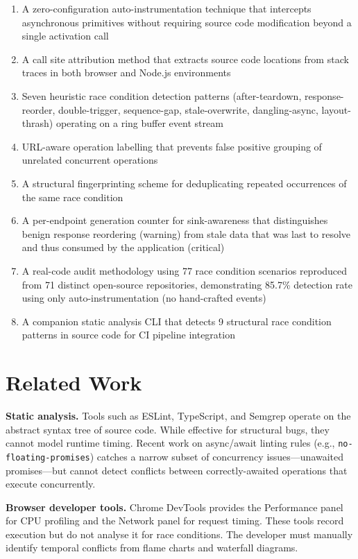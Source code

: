 \documentclass[11pt,a4paper]{article}
\begin{document}
\begin{enumerate}
  \item A zero-configuration auto-instrumentation technique that intercepts asynchronous primitives without requiring source code modification beyond a single activation call
  \item A call site attribution method that extracts source code locations from stack traces in both browser and Node.js environments
  \item Seven heuristic race condition detection patterns (after-teardown, response-reorder, double-trigger, sequence-gap, stale-overwrite, dangling-async, layout-thrash) operating on a ring buffer event stream
  \item URL-aware operation labelling that prevents false positive grouping of unrelated concurrent operations
  \item A structural fingerprinting scheme for deduplicating repeated occurrences of the same race condition
  \item A per-endpoint generation counter for sink-awareness that distinguishes benign response reordering (warning) from stale data that was last to resolve and thus consumed by the application (critical)
  \item A real-code audit methodology using 77 race condition scenarios reproduced from 71 distinct open-source repositories, demonstrating 85.7\% detection rate using only auto-instrumentation (no hand-crafted events)
  \item A companion static analysis CLI that detects 9 structural race condition patterns in source code for CI pipeline integration
\end{enumerate}

\section{Related Work}

\textbf{Static analysis.} Tools such as ESLint, TypeScript, and Semgrep operate on the abstract syntax tree of source code. While effective for structural bugs, they cannot model runtime timing. Recent work on async/await linting rules (e.g., \texttt{no-floating-promises}) catches a narrow subset of concurrency issues---unawaited promises---but cannot detect conflicts between correctly-awaited operations that execute concurrently.

\textbf{Browser developer tools.} Chrome DevTools provides the Performance panel for CPU profiling and the Network panel for request timing. These tools record execution but do not analyse it for race conditions. The developer must manually identify temporal conflicts from flame charts and waterfall diagrams.
\end{document}
